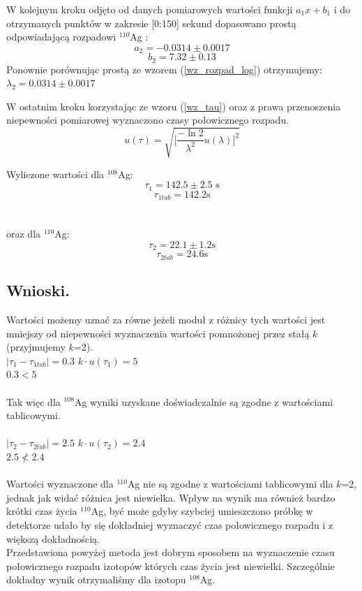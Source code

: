 \documentclass{article}
\begin{document}
W kolejnym kroku odjęto od danych pomiarowych wartości funkcji $a_1 x + b_1$ i do otrzymanych punktów w zakresie [0:150] sekund dopasowano prostą odpowiadającą rozpadowi $^{110}$Ag :
\[a_2 = -0.0314 \pm 0.0017
\]
\[b_2 = 7.32 \pm 0.13
\]
Ponownie porównując prostą ze wzorem (\ref{wz_rozpad_log}) otrzymujemy:\\
$\lambda _2 = 0.0314 \pm 0.0017$

W ostatnim kroku korzystając ze wzoru (\ref{wz_tau}) oraz z prawa przenoszenia niepewności pomiarowej wyznaczono czasy połowicznego rozpadu.
\begin{equation}
u(\tau) = \sqrt{ \Big[ \frac{-\ln 2}{\lambda ^2}u(\lambda) \Big]^2 }
\label{wz_niepewnosc}
\end{equation}

\noindent
Wyliczone wartości dla $^{108}$Ag:\\
\[\tau _1 = 142.5 \pm 2.5\text{ s}
\]
\[\tau _{1tab} = 142.2 \text{s}
\]
\\\\
oraz dla $^{110}$Ag:\\
\[\tau _2 = 22.1 \pm 1.2 \text{s}
\]
\[\tau _{2tab} = 24.6 \text{s}
\]


\subsection{Wnioski.}
Wartości możemy uznać za równe jeżeli moduł z różnicy tych wartości jest mniejszy od niepewności wyznaczenia wartości pomnożonej przez stałą $k$ (przyjmujemy $k$=2). \\
$|\tau _1 -\tau _{1tab}| = 0.3$  $k\cdot u(\tau _1)=  5$ \\
$0.3 < 5$\\\\
Tak więc dla $^{108}$Ag wyniki uzyskane doświadczalnie są zgodne z wartościami tablicowymi.\\\\

\noindent
$|\tau _2 -\tau _{2tab}| = 2.5$  $k\cdot u(\tau _2)=  2.4$ \\
$2.5 \not< 2.4$\\\\
Wartości wyznaczone dla $^{110}$Ag nie są zgodne z wartościami tablicowymi dla $k$=2, jednak jak widać różnica jest niewielka. Wpływ na wynik ma również bardzo krótki czas życia $^{110}$Ag, być może gdyby szybciej umieszczono próbkę w detektorze udało by się dokładniej wyznaczyć czas połowicznego rozpadu i z większą dokładnością.  \\
Przedstawiona powyżej metoda jest dobrym sposobem na wyznaczenie czasu połowicznego rozpadu izotopów których czas życia jest niewielki. Szczególnie dokładny wynik otrzymaliśmy dla izotopu $^{108}$Ag.
\end{document}
